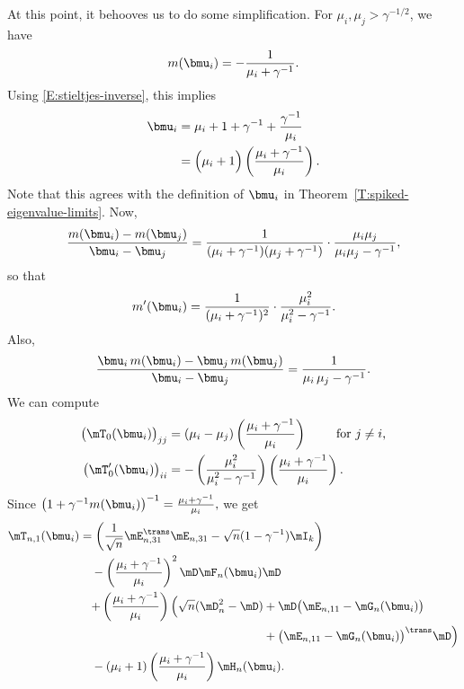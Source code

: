 At this point, it behooves us to do some simplification.  For $\mu_i, \mu_j > \gamma^{-1/2}$, we have
\[
    m(\bmu_i) = - \frac{1}{\mu_i + \gamma^{-1}}.
\]
Using \eqref{E:stieltjes-inverse}, this implies
\begin{align*}
    \bmu_i
        &= \mu_i + 1 + \gamma^{-1} + \frac{ \gamma^{-1} }{ \mu_i } \\
        &= \Big( \mu_i + 1 \Big)
           \left( \frac{ \mu_i + \gamma^{-1} }{ \mu_i } \right).
\end{align*}
Note that this agrees with the definition of $\bmu_i$ in Theorem~\ref{T:spiked-eigenvalue-limits}.  Now,
\[
    \frac{ m(\bmu_i) - m(\bmu_j) }
         { \bmu_i - \bmu_j }
    =
    \frac{1}{ ( \mu_i + \gamma^{-1} ) ( \mu_j + \gamma^{-1} ) }
    \cdot
    \frac{ \mu_i \mu_j }{ \mu_i \mu_j - \gamma^{-1} },
\]
so that
\[
    m'(\bmu_i)
    =
    \frac{ 1 }{ ( \mu_i + \gamma^{-1} )^2 }
    \cdot
    \frac{ \mu_i^2 }{ \mu_i^2 - \gamma^{-1} }.
\]
Also,
\[
    \frac{ \bmu_i \, m( \bmu_i ) - \bmu_j \, m( \bmu_j ) }
         { \bmu_i - \bmu_j }
        =
            \frac{1}{\mu_i \, \mu_j - \gamma^{-1}}.
\]
We can compute
\begin{align*}
    \big( \mT_0(\bmu_i) \big)_{jj}
        &=
            ( \mu_i - \mu_j )
            \left( \frac{ \mu_i + \gamma^{-1} }{ \mu_i } \right) 
                \qquad\text{ for $j \neq i$,} \\
    \big( \mT_0'(\bmu_i) \big)_{ii}
        &=
            -
            \left(
                \frac{ \mu_i^2 }{ \mu_i^2 - \gamma^{-1} }
            \right)
            \left(
                \frac{\mu_i + \gamma^{-1}}{ \mu_i }
            \right).
\end{align*}
Since
\(
    \big( 1 + \gamma^{-1} m( \bmu_i ) \big)^{-1}
        = \frac{ \mu_i + \gamma^{-1} }{ \mu_i },
\)
we get
\[
    \begin{split}
        \mT_{n,1}(\bmu_i)
           &=
                \left(
                    \frac{1}{\sqrt{n}}
                    \mE_{n,31}^\trans \mE_{n,31}
                    -
                    \sqrt{n}
                    (1 - \gamma^{-1})
                    \mI_k
                \right) \\
            &\quad-
                \left(
                    \frac{\mu_i + \gamma^{-1}}{\mu_i}
                \right)^2
                \mD \mF_n (\bmu_i ) \mD \\
            &
                \begin{split}
                \quad+
                \left(
                    \frac{\mu_i + \gamma^{-1}}{\mu_i}
                \right)
                \Big(
                    \sqrt{n} ( \mD_n^2 - \mD )
                    &+
                    \mD
                    \big( \mE_{n,11} - \mG_{n} (\bmu_i) \big) \\
                    &+
                    \big( \mE_{n,11} - \mG_{n} (\bmu_i) \big)^\trans                    
                    \mD
                \Big) 
                \end{split}\\
            &\quad-
                (\mu_i + 1)
                \left(
                    \frac{\mu_i + \gamma^{-1}}{\mu_i}
                \right)
                \mH_n(\bmu_i).
    \end{split}
\]
